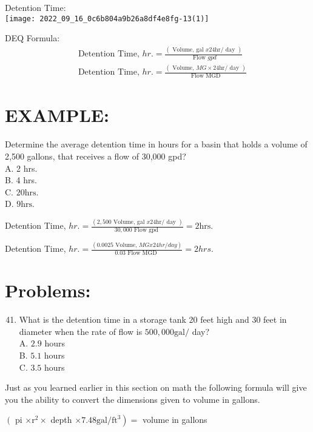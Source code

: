 \begin{enumerate}
Detention Time:\\

\texttt{[image: 2022\_09\_16\_0c6b804a9b26a8df4e8fg-13(1)]}

DEQ Formula:
$$
\begin{aligned}
&\text { Detention Time, } h r .=\frac{(\text { Volume, gal } x 24 \mathrm{hr} / \text { day })}{\text { Flow } g p d} \\
&\text { Detention Time, } h r .=\frac{(\text { Volume, } M G \times 24 \mathrm{hr} / \text { day })}{\text { Flow MGD }}
\end{aligned}
$$

\section{EXAMPLE:}
Determine the average detention time in hours for a basin that holds a volume of 2,500 gallons, that receives a flow of 30,000 gpd?\\
A. 2 hrs.\\
B. 4 hrs.\\
C. $20 \mathrm{hrs}$.\\
D. $9 \mathrm{hrs}$.

Detention Time, $h r .=\frac{(2,500 \text { Volume, gal } x 24 \mathrm{hr} / \text { day })}{30,000 \text { Flow gpd }}=2 \mathrm{hrs}$.

Detention Time, $h r .=\frac{(0.0025 \text { Volume, } M G x 24 h r / d a y)}{0.03 \text { Flow MGD }}=2 h r s$.

\section{Problems:}
\begin{enumerate}
  \setcounter{enumi}{40}
  \item What is the detention time in a storage tank 20 feet high and 30 feet in diameter when the rate of flow is $500,000 \mathrm{gal} /$ day?\\
A. $2.9$ hours\\
B. $5.1$ hours\\
C. $3.5$ hours
\end{enumerate}
Just as you learned earlier in this section on math the following formula will give you the ability to convert the dimensions given to volume in gallons.

$\left(\right.$ pi $\times \mathrm{r}^{2} \times$ depth $\left.\times 7.48 \mathrm{gal} / \mathrm{ft}^{3}\right)=$ volume in gallons


\end{enumerate}
